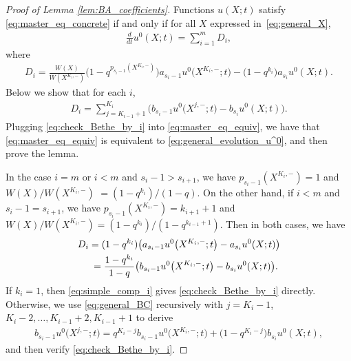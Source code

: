 \documentclass[pdftex]{sigma}
\numberwithin{equation}{section}
\begin{document}
\begin{proof}[Proof of Lemma \ref{lem:BA_coefficients}]
 Functions $u(X; t)$ satisfy \eqref{eq:master_eq_concrete} if and only if for all $X$ expressed in~\eqref{eq:general_X},
 \begin{gather} \label{eq:master_eq_equiv}
 \frac{d}{dt} u^0(X; t) = \sum^m_{i = 1} D_i,
 \end{gather}
 where
 \begin{gather*}
 D_i = \frac{W(X)}{W(X^{K_i, -})} \big(1 - q^{p_{s_i - 1}(X^{K_i, -})}\big) a_{s_i - 1} u^0\big(X^{K_i, -}; t\big) - \big(1 - q^{k_i}\big) a_{s_i} u^0(X; t).
 \end{gather*}
 Below we show that for each $i$,
 \begin{gather} \label{eq:check_Bethe_by_i}
 D_i = \sum^{K_i}_{j = K_{i - 1} + 1} \big( b_{s_i - 1} u^0\big(X^{ j, -}; t\big) - b_{s_i} u^0(X; t) \big).
 \end{gather}
 Plugging \eqref{eq:check_Bethe_by_i} into \eqref{eq:master_eq_equiv}, we have that \eqref{eq:master_eq_equiv} is equivalent to \eqref{eq:general_evolution_u^0}, and then prove the lemma.

 In the case $i = m$ or $i < m$ and $s_{i} - 1 > s_{i + 1}$, we have $p_{s_i - 1}(X^{K_i, -}) = 1$ and $W(X)/W(X^{K_i, -})$ $= (1 - q^{k_i})/(1 - q)$. On the other hand, if $i < m$ and $s_i - 1 = s_{i + 1}$, we have $p_{s_i - 1}(X^{K_i, -}) = k_{i + 1} + 1$ and $W(X)/W(X^{K_i, -}) = (1 - q^{k_i})/(1 - q^{k_{i - 1} + 1})$. Then in both cases, we have
 \begin{gather}
 D_i = (1 - q^{k_i}) \big( a_{s_i - 1} u^0\big(X^{K_i, -}; t\big) - a_{s_i} u^0(X; t) \big) \nonumber\\
 \hphantom{D_i}{} = \frac{1 - q^{k_i}}{1 - q} \big( b_{s_i - 1} u^0\big(X^{K_i, -}; t\big) - b_{s_i} u^0(X; t) \big).\label{eq:simple_comp_i}
 \end{gather}
 If $k_i = 1$, then \eqref{eq:simple_comp_i} gives \eqref{eq:check_Bethe_by_i} directly. Otherwise, we use \eqref{eq:general_BC} recursively with $j = K_i - 1$, $K_i - 2, \dotsc, K_{i - 1} + 2, K_{i - 1} + 1$ to derive
 \begin{gather*}
 b_{s_i - 1} u^0\big(X^{j, -}; t\big) = q^{K_i - j} b_{s_i - 1} u^0\big(X^{K_i, -}; t\big) + \big(1 - q^{K_i - j}\big) b_{s_i} u^0(X; t),
 \end{gather*}
 and then verify \eqref{eq:check_Bethe_by_i}.
\end{proof}
\end{document}
